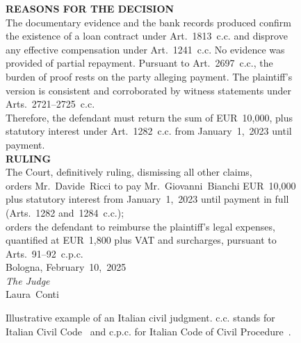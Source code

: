 \begin{figure}[htbp]
\begin{minipage}{0.9\linewidth}
\textbf{REASONS FOR THE DECISION}\\
The documentary evidence and the bank records produced confirm the existence of a loan contract under Art.~1813~c.c. and disprove any effective compensation under Art.~1241~c.c. No evidence was provided of partial repayment. Pursuant to Art.~2697~c.c., the burden of proof rests on the party alleging payment. The plaintiff's version is consistent and corroborated by witness statements under Arts.~2721--2725~c.c.\\
Therefore, the defendant must return the sum of EUR~10,000, plus statutory interest under Art.~1282~c.c. from January~1,~2023 until payment.\\[0.5em]

\textbf{RULING}\\
The Court, definitively ruling, dismissing all other claims,\\
orders Mr.~Davide~Ricci to pay Mr.~Giovanni~Bianchi EUR~10,000 plus statutory interest from January~1,~2023 until payment in full (Arts.~1282 and~1284~c.c.);\\
orders the defendant to reimburse the plaintiff's legal expenses, quantified at EUR~1,800 plus VAT and surcharges, pursuant to Arts.~91--92~c.p.c.\\[0.5em]
Bologna, February~10,~2025\\
\textit{The Judge}\\
Laura~Conti
\end{minipage}
\caption[Illustrative example of an Italian civil judgment.]{Illustrative example of an Italian civil judgment. c.c. stands for Italian Civil Code~\cite{CC} and c.p.c. for Italian Code of Civil Procedure~\cite{CPC}.}
\label{fig:civil-judgment-legal-articles}
\end{figure}





